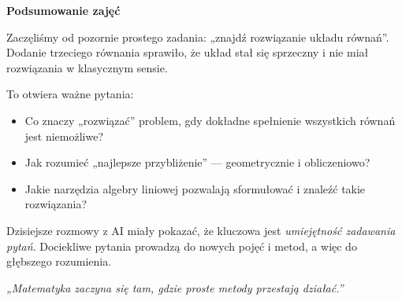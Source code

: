 \documentclass[12pt,a4paper]{article}
\begin{document}
\begin{center}
\Large \textbf{Podsumowanie zajęć}
\end{center}

\bigskip

Zaczęliśmy od pozornie prostego zadania: „znajdź rozwiązanie układu równań”.
Dodanie trzeciego równania sprawiło, że układ stał się sprzeczny i nie miał rozwiązania w klasycznym sensie.

To otwiera ważne pytania:
\begin{itemize}
    \item Co znaczy „rozwiązać” problem, gdy dokładne spełnienie wszystkich równań jest niemożliwe?
    \item Jak rozumieć „najlepsze przybliżenie” — geometrycznie i obliczeniowo?
    \item Jakie narzędzia algebry liniowej pozwalają sformułować i znaleźć takie rozwiązania?
\end{itemize}

Dzisiejsze rozmowy z AI miały pokazać, że kluczowa jest \emph{umiejętność zadawania pytań}.
Dociekliwe pytania prowadzą do nowych pojęć i metod, a więc do głębszego rozumienia.

\bigskip
\begin{center}
\textit{„Matematyka zaczyna się tam, gdzie proste metody przestają działać.”}
\end{center}
\end{document}
